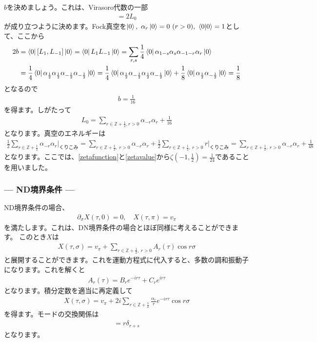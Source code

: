 \documentclass[report,paper=a4, fontsize=12pt, line_length=16cm, number_of_lines=33,dvipdfmx]{jlreq}
\numberwithin{equation}{chapter}
\numberwithin{equation}{section}
\newcommand{\Zb}{\mathbb{Z}}
\newcommand{\del}{\partial}
\newcommand{\Zbh}{\Zb+\frac12}
\begin{document}
$b$を決めましょう。これは、Virasoro代数の一部
\begin{align}
  [L_{1},L_{-1}]=2L_0
\end{align}
が成り立つように決めます。Fock真空を$\ket{0},\ \alpha_{r}\ket{0}=0\ (r>0),\ \braket{0}{0}=1$として、ここから
\begin{align}
  2b
  &=\bra{0}[L_{1},L_{-1}]\ket{0}
  =\bra{0}L_{1}L_{-1}\ket{0}
  =\sum_{r,s}\frac14\bra{0}\alpha_{1-s}\alpha_{s}\alpha_{-1-r}\alpha_{r}\ket{0}\nonumber\\
  &
  =\frac14\bra{0}\alpha_{\frac12}\alpha_{\frac12}\alpha_{-\frac12}\alpha_{-\frac12}\ket{0}
  =\frac14\bra{0}\alpha_{\frac12}\alpha_{-\frac12}\alpha_{\frac12}\alpha_{-\frac12}\ket{0}
  +\frac18\bra{0}\alpha_{\frac12}\alpha_{-\frac12}\ket{0}
  =\frac18
\end{align}
となるので
\begin{align}
  b=\frac{1}{16}
\end{align}
を得ます。しがたって
\begin{align}
  L_{0}=\sum_{r\in \Zbh,r>0}\alpha_{-r}\alpha_{r}+\frac{1}{16}
\end{align}
となります。真空のエネルギーは
\begin{align}
  \frac12 \sum_{r\in \Zbh}\alpha_{-r}\alpha_{r}\Bigg|_{\text{くりこみ}}
  =
  \sum_{r\in \Zbh,\ r>0}\alpha_{-r}\alpha_{r}
  +\frac12 \sum_{r\in \Zbh,\ r>0}r\Bigg|_{\text{くりこみ}}
  =
  \sum_{r\in \Zbh,\ r>0}\alpha_{-r}\alpha_{r}
  +\frac{1}{48}
\end{align}
となります。ここでは、\eqref{zetafunction}と\eqref{zetavalue}から$\zeta(-1,\frac12)=\frac{1}{24}$であることを用いました。

\subsubsection*{--- ND境界条件 ---}
ND境界条件の場合、
\begin{align}
  \del_{\sigma}X(\tau,0)=0,\quad X(\tau,\pi)=v_{\pi}
\end{align}
を満たします。これは、DN境界条件の場合とほぼ同様に考えることができます。
このとき$X$は
\begin{align}
  X(\tau,\sigma)=v_{\pi}+\sum_{r\in \Zbh,\ r>0}A_{r}(\tau)\cos r\sigma
\end{align}
と展開することができます。これを運動方程式に代入すると、多数の調和振動子になります。これを解くと
\begin{align}
  A_{r}(\tau)=B_{r}e^{-ir\tau}+C_{r}e^{ir\tau}
\end{align}
となります。積分定数を適当に再定義して
\begin{align}
  X(\tau,\sigma)=v_{\pi}+2i\sum_{r\in \Zbh}\frac{\alpha_{r}}{r}e^{-ir\tau}\cos r\sigma
\end{align}
を得ます。モードの交換関係は
\begin{align}
  [\alpha_{r},\alpha_{s}]=r\delta_{r+s}
\end{align}
となります。
\end{document}
